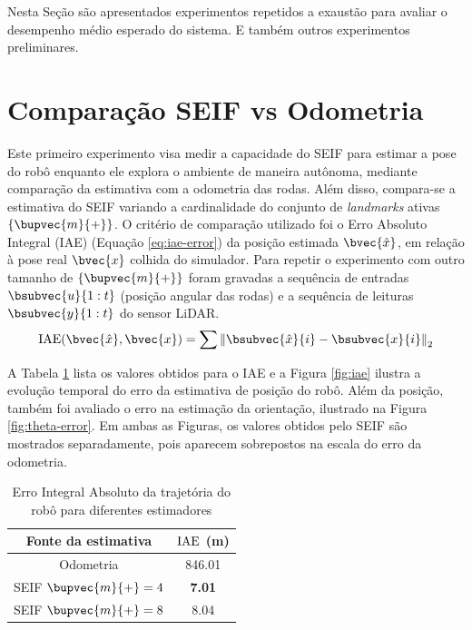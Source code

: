 Nesta Seção são apresentados experimentos repetidos a exaustão para avaliar o desempenho médio esperado do sistema. E também outros experimentos preliminares.

\section{Comparação SEIF vs Odometria}
\label{sec:exp-estimate-comparison}
Este primeiro experimento visa medir a capacidade do SEIF para estimar a 
pose do robô enquanto ele explora o ambiente de maneira autônoma, 
mediante comparação da estimativa 
com a odometria das rodas. Além disso, compara-se a estimativa do SEIF 
variando a cardinalidade do conjunto de \textit{landmarks} 
ativas $\{\bupvec{m}{+}\}$. O critério de comparação utilizado foi o 
Erro Absoluto Integral (IAE) (Equação \ref{eq:iae-error}) da posição estimada $\bvec{\hat{x}}$, em 
relação à pose real $\bvec{x}$ colhida do simulador. Para repetir o experimento com outro tamanho de $\{\bupvec{m}{+}\}$ foram gravadas a sequência de entradas $\bsubvec{u}{1:t}$ 
(posição angular das rodas) e a sequência de leituras $\bsubvec{y}{1:t}$ 
do sensor LiDAR.
\begin{equation}
  \IAE(\bvec{\hat{x}}, \bvec{x}) = \sum{
    \left\Vert \bsubvec{\hat{x}}{i} - \bsubvec{x}{i} \right\Vert_2
  }
  \label{eq:iae-error}
\end{equation}

A Tabela \ref{table:iae} lista os valores obtidos para o IAE e a Figura \ref{fig:iae} ilustra a evolução 
temporal do erro da estimativa de posição do robô. Além 
da posição, também foi avaliado o erro na estimação da 
orientação, ilustrado na Figura \ref{fig:theta-error}. Em ambas as 
Figuras, os valores obtidos pelo SEIF são mostrados separadamente, pois aparecem sobrepostos na escala do erro da odometria.

\begin{table}[]
\caption{Erro Integral Absoluto da trajetória do robô para diferentes estimadores}
\label{table:iae}
\center
\begin{tabular}{cc}
\hline
Fonte da estimativa & $\operatorname{IAE}$ (m) \\ \hline
Odometria & 846.01 \\
SEIF $\bupvec{m}{+} = 4$ & \textbf{7.01 }\\
SEIF $\bupvec{m}{+} = 8$ & 8.04 \\ \hline
\end{tabular}
\end{table}

